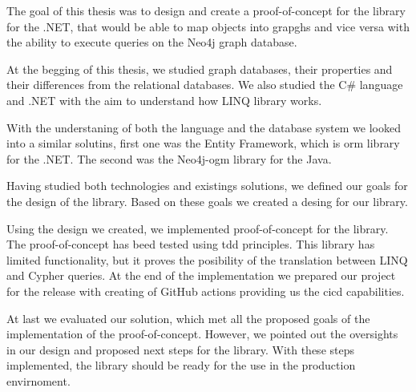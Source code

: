 \begin{conclusion}

    The goal of this thesis was to design and create a proof-of-concept for the library for the .NET, that would be able to map objects into grapghs
    and vice versa with the ability to execute queries on the Neo4j graph database.

    At the begging of this thesis, we studied graph databases, their properties and their differences from the relational databases.
    We also studied the C\# language and .NET with the aim to understand how LINQ library works.

    With the understaning of both the language and the database system we looked into a similar solutins, first one was the
    Entity Framework, which is \acrshort{orm} library for the .NET. The second was the Neo4j-\acrshort{ogm} library for the Java.

    Having studied both technologies and existings solutions, we defined our goals for the design of the library. Based on these goals
    we created a desing for our library.

    Using the design we created, we implemented proof-of-concept for the library. The proof-of-concept has beed tested using \acrshort{tdd}
    principles. This library has limited functionality, but it proves the posibility of the translation between LINQ and Cypher queries.
    At the end of the implementation we prepared our project for the release with creating of GitHub actions providing us the \acrshort{cicd}
    capabilities.

    At last we evaluated our solution, which met all the proposed goals of the implementation of the proof-of-concept.
    However, we pointed out the oversights in our design and proposed next steps for the library.
    With these steps implemented, the library should be ready for the use in the production envirnoment.


\end{conclusion}